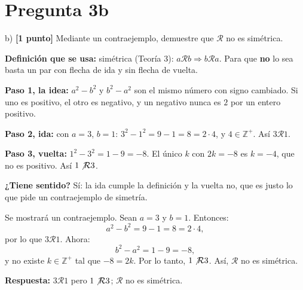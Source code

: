 \documentclass[11pt]{article}
\newcommand{\R}{\mathcal R}
\newcommand{\hl}[1]{\colorbox{green!35}{#1}}
\begin{document}
\clearpage
\section*{Pregunta 3b}

b) \textbf{[1 punto]} Mediante un \hl{contraejemplo}, demuestre que $\R$ \hl{no es simétrica}.

\begin{center}
\end{center}


\begin{explica}
\textbf{Definición que se usa:} simétrica (Teoría 3): $a\R b\Rightarrow b\R a$. Para que \textbf{no} lo sea basta un par con flecha de ida y sin flecha de vuelta.

\textbf{Paso 1, la idea:} $a^2-b^2$ y $b^2-a^2$ son el mismo número con signo cambiado. Si uno es positivo, el otro es negativo, y un negativo nunca es $2$ por un entero positivo.

\textbf{Paso 2, ida:} con $a=3$, $b=1$: $3^2-1^2=9-1=8=2\cdot4$, y $4\in\mathbb Z^+$. Así $3\R1$.

\textbf{Paso 3, vuelta:} $1^2-3^2=1-9=-8$. El único $k$ con $2k=-8$ es $k=-4$, que no es positivo. Así $1\not\R 3$.

\textbf{¿Tiene sentido?} Sí: la ida cumple la definición y la vuelta no, que es justo lo que pide un contraejemplo de simetría.
\end{explica}

Se mostrará un contraejemplo. Sean $a=3$ y $b=1$. Entonces:
\[a^2-b^2=9-1=8=2\cdot4,\]
por lo que $3\R1$. Ahora:
\[b^2-a^2=1-9=-8,\]
y no existe $k\in\mathbb Z^+$ tal que $-8=2k$. Por lo tanto, $1\not\R3$. Así, $\R$ no es simétrica.

\textbf{Respuesta:} $3\R1$ pero $1\not\R3$; $\R$ no es simétrica.
\end{document}
